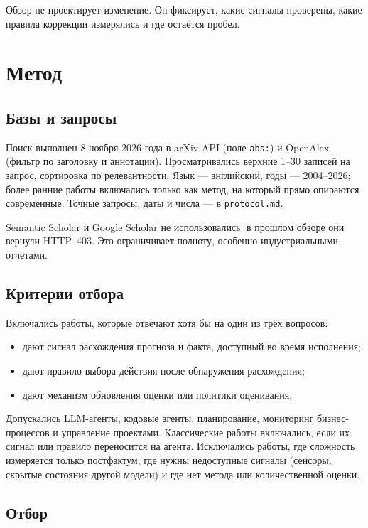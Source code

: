 \documentclass[11pt,a4paper]{article}
\begin{document}
Обзор не проектирует изменение. Он фиксирует, какие сигналы проверены,
какие правила коррекции измерялись и где остаётся пробел.

\section{Метод}

\subsection{Базы и запросы}

Поиск выполнен 8 ноября 2026 года в arXiv API (поле \texttt{abs:}) и
OpenAlex (фильтр по заголовку и аннотации). Просматривались
верхние 1--30 записей на запрос, сортировка по релевантности. Язык —
английский, годы — 2004--2026; более ранние работы включались только как
метод, на который прямо опираются современные. Точные запросы, даты и
числа — в \texttt{protocol.md}.

Semantic Scholar и Google Scholar не использовались: в прошлом обзоре они
вернули HTTP~403. Это ограничивает полноту, особенно индустриальными
отчётами.

\subsection{Критерии отбора}

Включались работы, которые отвечают хотя бы на один из трёх вопросов:
\begin{itemize}
  \item дают сигнал расхождения прогноза и факта, доступный во время
        исполнения;
  \item дают правило выбора действия после обнаружения расхождения;
  \item дают механизм обновления оценки или политики оценивания.
\end{itemize}

Допускались LLM-агенты, кодовые агенты, планирование, мониторинг бизнес-
процессов и управление проектами. Классические работы включались, если их
сигнал или правило переносится на агента. Исключались работы, где сложность
измеряется только постфактум, где нужны недоступные сигналы (сенсоры,
скрытые состояния другой модели) и где нет метода или количественной
оценки.

\subsection{Отбор}
\end{document}

